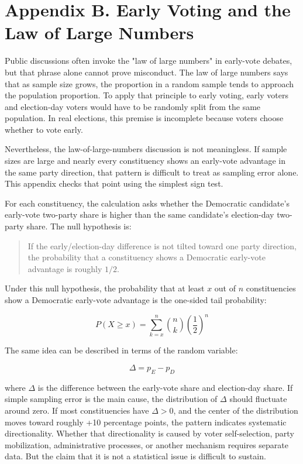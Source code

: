 \documentclass[preprint]{../ieie/IEIE}
\begin{document}
\section*{Appendix B. Early Voting and the Law of Large Numbers}

Public discussions often invoke the "law of large numbers" in early-vote debates, but that phrase alone cannot prove misconduct. The law of large numbers says that as sample size grows, the proportion in a random sample tends to approach the population proportion. To apply that principle to early voting, early voters and election-day voters would have to be randomly split from the same population. In real elections, this premise is incomplete because voters choose whether to vote early.

Nevertheless, the law-of-large-numbers discussion is not meaningless. If sample sizes are large and nearly every constituency shows an early-vote advantage in the same party direction, that pattern is difficult to treat as sampling error alone. This appendix checks that point using the simplest sign test.

For each constituency, the calculation asks whether the Democratic candidate's early-vote two-party share is higher than the same candidate's election-day two-party share. The null hypothesis is:

\begin{quote}
If the early/election-day difference is not tilted toward one party direction, the probability that a constituency shows a Democratic early-vote advantage is roughly \(1/2\).
\end{quote}

Under this null hypothesis, the probability that at least \(x\) out of \(n\) constituencies show a Democratic early-vote advantage is the one-sided tail probability:

\[
P(X \ge x) = \sum_{k=x}^{n} \binom{n}{k}\left(\frac{1}{2}\right)^n
\]

The same idea can be described in terms of the random variable:

\[
\Delta = p_E - p_D
\]

where \(\Delta\) is the difference between the early-vote share and election-day share. If simple sampling error is the main cause, the distribution of \(\Delta\) should fluctuate around zero. If most constituencies have \(\Delta>0\), and the center of the distribution moves toward roughly +10 percentage points, the pattern indicates systematic directionality. Whether that directionality is caused by voter self-selection, party mobilization, administrative processes, or another mechanism requires separate data. But the claim that it is not a statistical issue is difficult to sustain.
\end{document}
